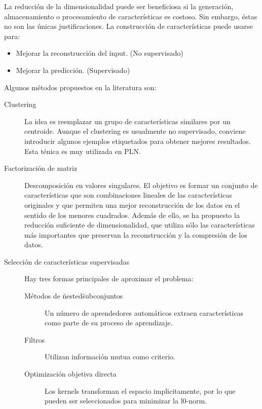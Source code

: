 \documentclass[11pt,spanish]{article}
\begin{document}
La reducción de la dimensionalidad puede ser beneficiosa si la generación, almacenamiento o procesamiento de características es costoso. Sin embargo, éstas no son las únicas justificaciones. La construcción de características puede usarse para:
\begin{itemize}
    \item Mejorar la reconstrucción del input. (No supervisado)
    \item Mejorar la predicción. (Supervisado)
\end{itemize}
Algunos métodos propuestos en la literatura son:
\begin{description}
    \item[Clustering] La idea es reemplazar un grupo de características similares por un centroide. Aunque el clustering es usualmente no supervisado, conviene introducir algunos ejemplos etiquetados para obtener mejores resultados. Esta ténica es muy utilizada en PLN.
    \item[Factorización de matriz] Descomposición en valores singulares. El objetivo es formar un conjunto de características que son combinaciones lineales de las características originales y que permiten una mejor reconstrucción de los datos en el sentido de los menores cuadrados. Además de ello, se ha propuesto la reducción suficiente de dimensionalidad, que utiliza sólo las características más importantes que preservan la reconstrucción y la compresión de los datos.
    \item[Selección de características supervisadas] Hay tres formas principales de aproximar el problema:
    \begin{description}
        \item[Métodos de \"nested\" subconjuntos] Un número de aprendedores automáticos extraen características como parte de su proceso de aprendizaje.
        \item[Filtros] Utilizan información mutua como criterio.
        \item[Optimización objetiva directa] Los kernels transforman el espacio implicitamente, por lo que pueden ser seleccionados para minimizar la l0-norm.
    \end{description}
\end{description}
\end{document}
